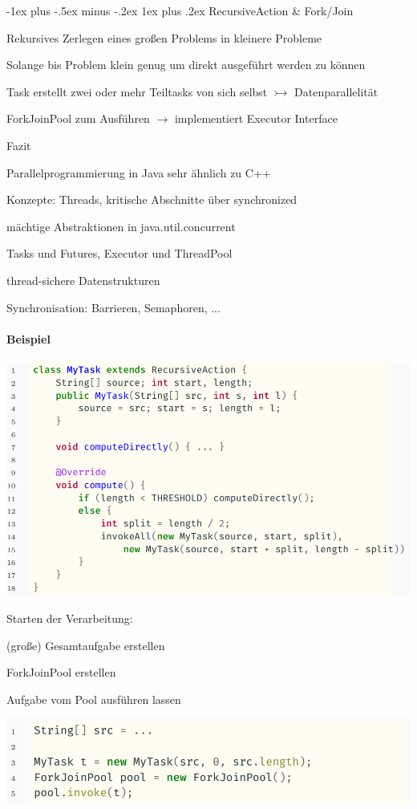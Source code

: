 \documentclass[10pt]{article}
\makeatletter
\renewcommand{\subsubsection}{\@startsection{subsubsection}{3}{0mm}%
                                {-1ex plus -.5ex minus -.2ex}%
                                {1ex plus .2ex}%
                                {\normalfont\small\bfseries}}
\makeatother
\begin{document}
  \subsubsection{RecursiveAction \& Fork/Join}
  \begin{itemize*}
    \item Rekursives Zerlegen eines großen Problems in kleinere Probleme
    \item Solange bis Problem klein genug um direkt ausgeführt werden zu können
    \item Task erstellt zwei oder mehr Teiltasks von sich selbst $\rightarrowtail$ Datenparallelität
    \item ForkJoinPool zum Ausführen $\rightarrow$ implementiert Executor Interface
    \item Fazit
    \begin{itemize*}
      \item Parallelprogrammierung in Java sehr ähnlich zu C++
      \item Konzepte: Threads, kritische Abschnitte über synchronized
      \item mächtige Abstraktionen in java.util.concurrent
      \begin{itemize*}
        \item Tasks und Futures, Executor und ThreadPool
        \item thread-sichere Datenstrukturen
        \item Synchronisation: Barrieren, Semaphoren, ...
      \end{itemize*}
    \end{itemize*}
  \end{itemize*}
  
  \paragraph{Beispiel}
  
  \begin{center}
    \includegraphics[width=0.4\linewidth]{Assets/Programmierparadigmen-code-snippet-55}
  \end{center}
  Starten der Verarbeitung: 
  \begin{enumerate*}
    \item (große) Gesamtaufgabe erstellen
    \item ForkJoinPool erstellen
    \item Aufgabe vom Pool ausführen lassen
  \end{enumerate*}
  \begin{center}
    \includegraphics[width=0.4\linewidth]{Assets/Programmierparadigmen-code-snippet-56}
  \end{center}
  
\end{document}
